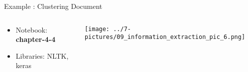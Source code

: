 \documentclass[11pt]{beamer}
\begin{document}
\begin{frame}{Example : Clustering Document}
\begin{columns}[T] %
\begin{column}{.48\textwidth}
        \begin{itemize}
		\item Notebook: \textbf{chapter-4-4}
		\item Libraries: NLTK, keras
        \end{itemize}
\end{column}%
\hfill%
\begin{column}{.48\textwidth}
        \texttt{[image: ../7-pictures/09\_information\_extraction\_pic\_6.png]}
\end{column}%
\end{columns}
\end{frame}

\end{document}
